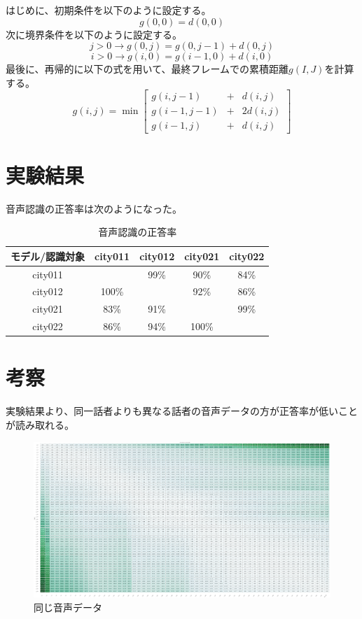 \documentclass[a4paper,12pt]{article}
\begin{document}
はじめに、初期条件を以下のように設定する。
\[
    g(0,0) = d(0,0)
\]
次に境界条件を以下のように設定する。
\[
    j>0 \rightarrow g(0,j) = g(0,j-1) + d(0,j)
\]
\[
    i>0 \rightarrow g(i,0) = g(i-1,0) + d(i,0)
\]
最後に、再帰的に以下の式を用いて、最終フレームでの累積距離$g(I,J)$を計算する。
\[
g(i, j)=\min \left[\begin{array}{llr}
g(i, j-1) & + & d(i, j) \\
g(i-1, j-1) & + & 2 d(i, j) \\
g(i-1, j) & + & d(i, j)
\end{array}\right]
\]

\section{実験結果}

音声認識の正答率は次のようになった。

\begin{table}[htbp]
    \centering
    \begin{tabular}{|c|c|c|c|c|}
      \hline
      モデル/認識対象 & city011 & city012 & city021 & city022 \\
      \hline
      city011 &       & 99\% & 90\%  & 84\% \\
      \hline
      city012 & 100\% &      & 92\%  & 86\% \\
      \hline
      city021 & 83\%  & 91\% &       & 99\% \\
      \hline
      city022 & 86\% &  94\% & 100\%  &      \\
      \hline
    \end{tabular}
    \caption{音声認識の正答率}
    \label{tab:音声認識の正答率}
  \end{table}

\newpage

\section{考察}
実験結果より、同一話者よりも異なる話者の音声データの方が正答率が低いことが読み取れる。
\begin{figure}[h]
    \centering
    \includegraphics[bb=0.000000 0.000000 1329.122658 697.681395,width=1.0\hsize]{./equal.png}
    \caption{同じ音声データ}
    \label{fig:equal}
\end{figure}
\end{document}
